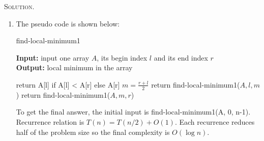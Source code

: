 \documentclass[12pt, a4paper, oneside]{ctexart}
\newenvironment{solution}{\par\noindent\textsc{Solution. }}{\\\par}
\begin{document}
\begin{solution}
    \begin{enumerate}
        \item The pseudo code is shown below:
        \begin{algorithm}[H]
            \caption{find-local-minimum1} %
            \label{alg: find_local_minimum1}
            \hspace*{0.02in} {\bf Input:} %
            input one array $A$, its begin index $l$ and its end index $r$\\
            \hspace*{0.02in} {\bf Output:} %
            local minimum in the array
            \begin{algorithmic}[1]
                    \State return A[l] if A[l] < A[r] else A[r]
                \EndIf
                \State $m=\frac{r + l}{2}$
                    \State return find-local-minimum1($A, l, m$)
                \Else
                        \State return find-local-minimum1($A, m, r$)
                    

            \end{algorithmic}
        \end{algorithm}
        To get the final answer, the initial input is find-local-minimum1(A, 0, n-1). Recurrence relation is $T(n) = T(n / 2) + O(1)$. Each recurrence reduces half of the problem size so the final complexity is $O(\log n)$.
        

\end{enumerate}
\end{solution}
\end{document}
